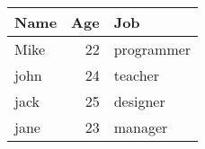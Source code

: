 \begin{tabular}{lrl}
\hline
 Name   &   Age & Job        \\
\hline
 Mike   &    22 & programmer \\
 john   &    24 & teacher    \\
 jack   &    25 & designer   \\
 jane   &    23 & manager    \\
\hline
\end{tabular}